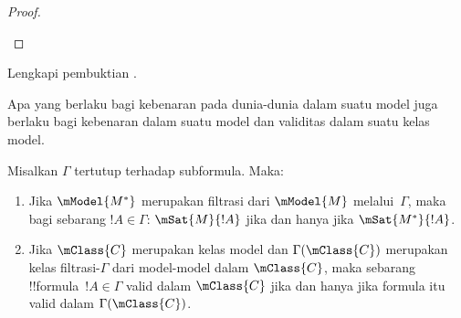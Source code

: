 \documentclass[../../../include/open-logic-section]{subfiles}
\begin{document}
\begin{proof}
\begin{enumerate}
  \end{enumerate}
\end{proof}

\begin{prob}
  Lengkapi pembuktian .
\end{prob}

Apa yang berlaku bagi kebenaran pada dunia-dunia dalam suatu model juga
berlaku bagi kebenaran dalam suatu model dan validitas dalam suatu kelas model.

\begin{cor}
  Misalkan $\Gamma$ tertutup terhadap subformula. Maka:
  \begin{enumerate}
  \item Jika $\mModel{M^*}$ merupakan filtrasi dari $\mModel{M}$
    melalui~$\Gamma$, maka bagi sebarang $!A \in \Gamma$:
    $\mSat{M}{!A}$ jika dan hanya jika $\mSat{M^*}{!A}$.
  \item Jika $\mClass{C}$ merupakan kelas model dan $\Gamma(\mClass{C})$
    merupakan kelas filtrasi-$\Gamma$ dari model-model dalam $\mClass{C}$,
    maka sebarang !!{formula}~$!A \in \Gamma$ valid dalam $\mClass{C}$ jika
    dan hanya jika formula itu valid dalam $\Gamma(\mClass{C})$.
  \end{enumerate}
\end{cor}
\end{document}
